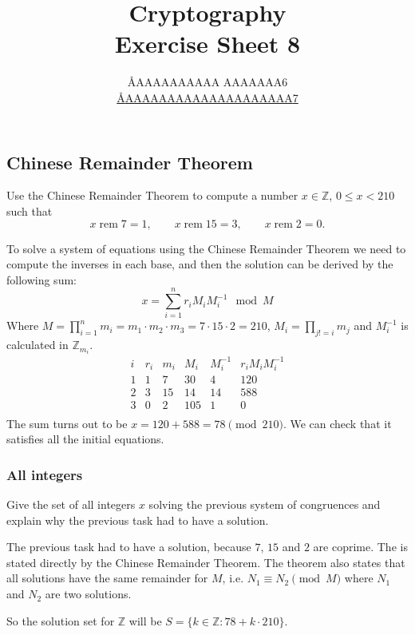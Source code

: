 \documentclass{article}
\title{Cryptography \\ Exercise Sheet 8}
\author{
  \AA{AAAAAAAAAA AAAAAAA}{6} \\
  \href{mailto:\AA{AAAAAAAAAAAAAAAAAAAA}{7}}{\AA{AAAAAAAAAAAAAAAAAAAA}{7}}
}
\newcommand{\Z}{\mathbb{Z}}
\begin{document}
  \maketitle

  \setcounter{section}{8}
  \subsection{Chinese Remainder Theorem}
  \begin{centerframebox}
    Use the Chinese Remainder Theorem to compute a number $x \in \Z$, $0 \leq x < 210$ such that
    \[ x \operatorname{rem} 7 = 1, \qquad x \operatorname{rem} 15 = 3, \qquad x \operatorname{rem} 2 = 0. \]
  \end{centerframebox}
  To solve a system of equations using the Chinese Remainder Theorem we need to compute the inverses in each base,
  and then the solution can be derived by the following sum:
  \[ x = \sum_{i=1}^n r_i M_i M_i^{-1} \mod M \]
  Where $M = \prod_{i=1}^n m_i = m_1 \cdot m_2 \cdot m_3 = 7 \cdot 15 \cdot 2 = 210$, $M_i = \prod_{j != i} m_j$
  and $M_i^{-1}$ is calculated in $\Z_{m_i}$.
  \[
    \begin{array}{c|c|c|c|c|c}
      i & r_i & m_i & M_i & M_i^{-1} & r_i M_i M_i^{-1} \\
      \hline
      1 & 1 & 7 & 30 & 4 & 120 \\
      2 & 3 & 15 & 14 & 14 & 588 \\
      3 & 0 & 2 & 105 & 1 & 0 \\
    \end{array}
  \]
  The sum turns out to be $x = 120+588 = 78 \pmod{210}$. We can check that it satisfies all the initial equations.

  \subsubsection{All integers}
  \begin{centerframebox}
    Give the set of all integers $x$ solving the previous system of congruences and explain why the previous task had to have a solution.
  \end{centerframebox}
  The previous task had to have a solution, because $7$, $15$ and $2$ are coprime.
  The is stated directly by the Chinese Remainder Theorem.
  The theorem also states that all solutions have the same remainder for $M$,
  i.e. $N_1 \equiv N_2 \pmod{M}$ where $N_1$ and $N_2$ are two solutions.

  So the solution set for $\Z$ will be $S = \{k \in \Z : 78 + k \cdot 210\}$.
\end{document}
